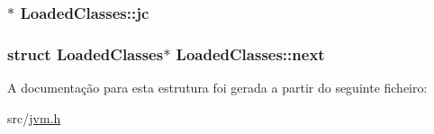 \subsubsection[{\texorpdfstring{jc}{jc}}]{$\ast$ Loaded\+Classes\+::jc}\hypertarget{structLoadedClasses_a9926f0f305ae1f117b2709b17c9084d8}{}\label{structLoadedClasses_a9926f0f305ae1f117b2709b17c9084d8}
\subsubsection[{\texorpdfstring{next}{next}}]{\setlength{\rightskip}{0pt plus 5cm}struct {\bf Loaded\+Classes}$\ast$ Loaded\+Classes\+::next}\hypertarget{structLoadedClasses_a66c15555a97e890e2967fac61bb540b8}{}\label{structLoadedClasses_a66c15555a97e890e2967fac61bb540b8}


A documentação para esta estrutura foi gerada a partir do seguinte ficheiro\+:\begin{DoxyCompactItemize}
\item 
src/\hyperlink{jvm_8h}{jvm.\+h}\end{DoxyCompactItemize}
